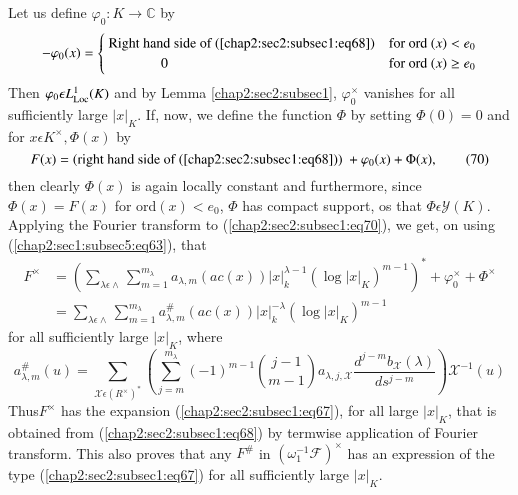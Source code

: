  Let us define $\varphi_{0}: K\rightarrow\mathbb{C}$ by
\begin{equation*}
-\varphi_{0}(x)=
\begin{cases}
\text{ Right hand side of (\ref{chap2:sec2:subsec1:eq68})} & \text{for
    ord }(x)<e_{0}\\ 
  \qquad\qquad 0  & \text{for ord }(x)\ge e_{0}        
\end{cases}
\end{equation*}
 Then $\varphi_{0}\epsilon L_{\operatorname{Loc}}^{1}(K)$ and by
 Lemma \ref{chap2:sec2:subsec1},
 $\varphi_{0}^{\times}$ vanishes for all sufficiently large
 $|x|_{K}$. If, now, we define the function $\Phi$ by setting
 $\Phi(0)=0$ and for $x\epsilon K^{\times}, \Phi(x)$ by 
\begin{equation*}
  F(x)=\text{(right hand side of (\ref{chap2:sec2:subsec1:eq68}))}~
  +\varphi_{0}(x)+\Phi(x),\tag{70}\label{chap2:sec2:subsec1:eq70} 
\end{equation*}
  then clearly $\Phi(x)$ is again locally constant and furthermore,
  since $\Phi(x)=F(x)$ for ord$(x)<e_{0}$, $\Phi$ has compact support,
  os that $\Phi\epsilon\mathscr{Y}(K)$. Applying the Fourier transform
  to (\ref{chap2:sec2:subsec1:eq70}), we get, on using
  (\ref{chap2:sec1:subsec5:eq63}), that 
\begin{align*}
  F^{\times}& =\left(\sum\limits_{\lambda \epsilon
    \wedge}\sum\limits_{m=1}^{m_{\lambda}}a_{\lambda,m}(ac(x))|x|_{k}^{\lambda-1}(\log
  |x|_{K})^{m-1}\right)^*+\varphi_{0}^{\times}+\Phi^{\times}\\
  & =\sum\limits_{\lambda \epsilon
    \wedge}\sum\limits_{m=1}^{m_{\lambda}}a_{\lambda,m}^{\#}(ac(x))
  |x|_{k}^{-\lambda}(\log |x|_{K})^{m-1}
\end{align*}
 for all sufficiently large $|x|_{K}$, where
\begin{equation*}
  a_{\lambda, m}^{\#}(u)=\sum\limits_{\mathcal{X} \epsilon
    ({R^{\times}})^*}\left(\sum\limits_{j=m}^{m_{\lambda}}(-1)^{m-1}
  \binom{j-1}{m-1}a_{\lambda,
    j,\mathcal{X}}\frac{d^{j-m}b_{\mathcal{X}}(\lambda)}{ds^{j-m}}\right)
  \mathcal{X}^{-1}(u)\tag{71}\label{chap2:sec2:subsec1:eq71}
\end{equation*}
 Thus\pageoriginale $F^{\times}$ has the expansion (\ref{chap2:sec2:subsec1:eq67}),
 for all large $|x|_{K}$, 
 that is obtained from (\ref{chap2:sec2:subsec1:eq68}) by termwise application of Fourier
 transform. This also proves that any $F^{\#}$ in
 $(\omega_{1}^{-1} \mathscr{F})^{\times}$ has an expression of the type
 (\ref{chap2:sec2:subsec1:eq67}) for all sufficiently large $|x|_{K}$. 

